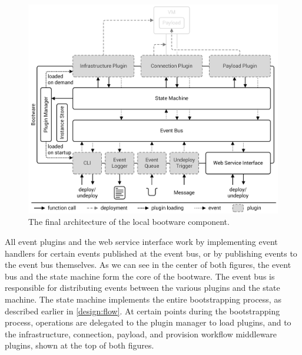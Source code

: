 \begin{figure}[!htbp]
	\centering
	\includegraphics[resolution=600]{design/assets/final_architecture_local}
	\caption{The final architecture of the local bootware component.}
	\label{image:finalarchlocal}
\end{figure}

All event plugins and the web service interface work by implementing event handlers for certain events published at the event bus, or by publishing events to the event bus themselves.
As we can see in the center of both figures, the event bus and the state machine form the core of the bootware.
The event bus is responsible for distributing events between the various plugins and the state machine.
The state machine implements the entire bootstrapping process, as described earlier in \autoref{design:flow}.
At certain points during the bootstrapping process, operations are delegated to the plugin manager to load plugins, and to the infrastructure, connection, payload, and provision workflow middleware plugins, shown at the top of both figures.

